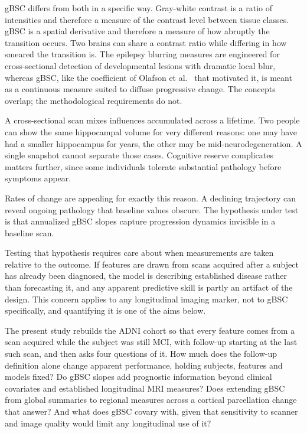 \documentclass[blue]{ludusofficial}  %
\begin{document}
gBSC differs from both in a specific way. Gray-white contrast is a ratio of intensities and therefore a measure of the contrast level between tissue classes. gBSC is a spatial derivative and therefore a measure of how abruptly the transition occurs. Two brains can share a contrast ratio while differing in how smeared the transition is. The epilepsy blurring measures are engineered for cross-sectional detection of developmental lesions with dramatic local blur, whereas gBSC, like the coefficient of Olafson et al.~\cite{olafson2021bsc} that motivated it, is meant as a continuous measure suited to diffuse progressive change. The concepts overlap; the methodological requirements do not.

A cross-sectional scan mixes influences accumulated across a lifetime. Two people can show the same hippocampal volume for very different reasons: one may have had a smaller hippocampus for years, the other may be mid-neurodegeneration. A single snapshot cannot separate those cases. Cognitive reserve complicates matters further, since some individuals tolerate substantial pathology before symptoms appear.

Rates of change are appealing for exactly this reason. A declining trajectory can reveal ongoing pathology that baseline values obscure. The hypothesis under test is that annualized gBSC slopes capture progression dynamics invisible in a baseline scan.

Testing that hypothesis requires care about when measurements are taken relative to the outcome. If features are drawn from scans acquired after a subject has already been diagnosed, the model is describing established disease rather than forecasting it, and any apparent predictive skill is partly an artifact of the design. This concern applies to any longitudinal imaging marker, not to gBSC specifically, and quantifying it is one of the aims below.

The present study rebuilds the ADNI cohort so that every feature comes from a scan acquired while the subject was still MCI, with follow-up starting at the last such scan, and then asks four questions of it. How much does the follow-up definition alone change apparent performance, holding subjects, features and models fixed? Do gBSC slopes add prognostic information beyond clinical covariates and established longitudinal MRI measures? Does extending gBSC from global summaries to regional measures across a cortical parcellation change that answer? And what does gBSC covary with, given that sensitivity to scanner and image quality would limit any longitudinal use of it?
\end{document}
